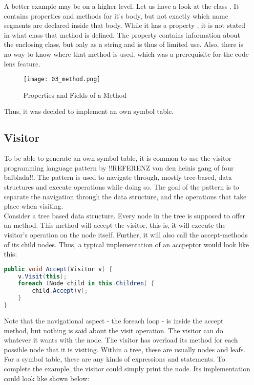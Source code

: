 A better example may be on a higher level.
Let us have a look at the class .
It contains properties and methods for it's body, but not exactly which name segments are declared inside that body.
While it has a property , it is not stated in what class that method is defined.
The property  contains information about the enclosing class, but only as a string and is thus of limited use.
Also, there is no way to know where that method is used, which was a prerequisite for the code lens feature.

\begin{figure}[H]
    \centering
    \texttt{[image: 03\_method.png]}
    \caption{Properties and Fields of a Method}
    \label{fig:method}
\end{figure}

Thus, it was decided to implement an own symbol table.

\subsection{Visitor}
To be able to generate an own symbol table, it is common to use the visitor programming language pattern by !!REFERENZ von den heinis gang of four balblada!!.
The pattern is used to navigate through, mostly tree-based, data structures and execute operations while doing so.
The goal of the pattern is to separate the navigation through the data structure, and the operations that take place when visiting.\\

Consider a tree based data structure.
Every node in the tree is supposed to offer an  method.
This method will accept the visitor, this is, it will execute the visitor's operation on the node itself.
Further, it will also call the accept-methods of its child nodes.
Thus, a typical implementation of an accpeptor would look like this:

\begin{lstlisting}[language=csharp, caption={Example for Accept}, captionpos=b, label={lst:accept}]
public void Accept(Visitor v) {
    v.Visit(this);
    foreach (Node child in this.Children) {
        child.Accept(v);
    }
}
\end{lstlisting}

Note that the navigational aspect - the foreach loop - is inside the accept method, but nothing is said about the visit operation.
The visitor can do whatever it wants with the node.
The visitor has overload its  method for each possible node that it is visiting.
Within a tree, these are usually nodes and leafs.
For a symbol table, these are any kinds of expressions and statements.
To complete the example, the visitor could simply print the node.
Its implementation could look like shown below:

